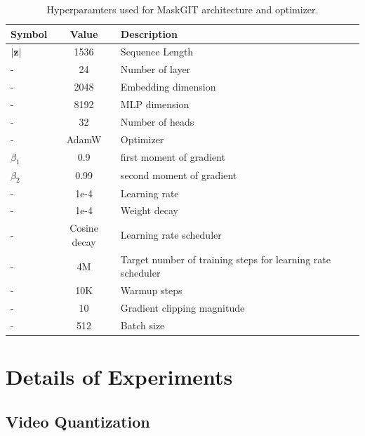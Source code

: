 \begin{table}[hbtp]
    \centering
    \begin{tabular}{l|c|l}
         Symbol & Value & Description \\\hline
         $|\mathbf{z}|$ & 1536 & Sequence Length \\
         - & 24 & Number of layer \\
         - & 2048 & Embedding dimension \\
         - & 8192 & MLP dimension \\
         - & 32 & Number of heads \\
         \hline
         - & AdamW &  Optimizer \\
         $\beta_1$ & 0.9 & first moment of gradient \\
         $\beta_2$ & 0.99 & second moment of gradient \\
         - & 1e-4 & Learning rate \\ 
         - & 1e-4 & Weight decay \\ 
         - & Cosine decay & Learning rate scheduler \\ 
         - & 4M & Target number of training steps for learning rate scheduler \\
         - & 10K & Warmup steps \\
         - & 10 & Gradient clipping magnitude \\
         - & 512 & Batch size \\
    \end{tabular}
    \caption{Hyperparamters used for MaskGIT architecture and optimizer.}
    \label{tab:hparams_maskgit}
\end{table}

\section{Details of Experiments}

\subsection{Video Quantization}
\label{app:sec:vid_quant}
